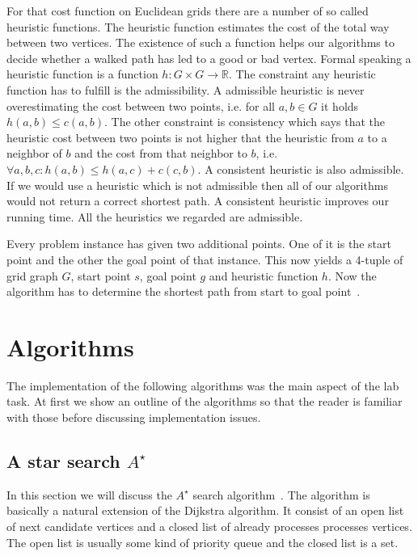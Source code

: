 \documentclass{article}
\begin{document}
    For that cost function on Euclidean grids there are a number of so called heuristic functions. The heuristic function estimates the cost of the total way between two vertices. The existence of such a function helps our algorithms to decide whether a walked path has led to a good or bad vertex. Formal speaking a heuristic function is a function $h : G \times G \rightarrow \mathbb{R}$. The constraint any heuristic function has to fulfill is the admissibility. A admissible heuristic is never overestimating the cost between two points, i.e. for all $a, b \in G$ it holds $h(a, b) \leq c(a,b)$. The other constraint is consistency which says that the heuristic cost between two points is not higher that the heuristic from $a$ to a neighbor of $b$ and the cost from that neighbor to $b$, i.e. $\forall a, b, c: h(a, b) \leq h(a, c) + c(c, b)$. A consistent heuristic is also admissible. If we would use a heuristic which is not admissible then all of our algorithms would not return a correct shortest path. A consistent heuristic improves our running time. All the heuristics we regarded are admissible.

    Every problem instance has given two additional points. One of it is the start point and the other the goal point of that instance. This now yields a 4-tuple of grid graph $G$, start point $s$, goal point $g$ and heuristic function $h$. Now the algorithm has to determine the shortest path from start to goal point~\cite{DBLP:conf/aaai/HaraborG11}.



    \section{Algorithms}
    \label{sec:algorithms}

    The implementation of the following algorithms was the main aspect of the lab task. At first we show an outline of the algorithms so that the reader is familiar with those before discussing implementation issues.

    \subsection{A star search $A^\star$ }

    In this section we will discuss the $A^\star$ search algorithm~\cite{Astar}. The algorithm is basically a natural extension of the Dijkstra algorithm. It consist of an open list of next candidate vertices and a closed list of already processes processes vertices. The open list is usually some kind of priority queue and the closed list is a set.
\end{document}
